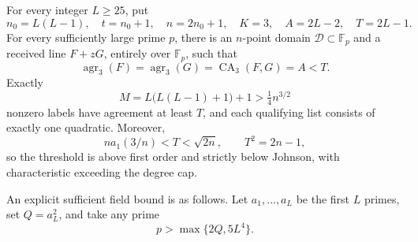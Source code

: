 \begin{theorem}
\label{thm:prime-quadratic-intersection-line}
For every integer $L\ge25$, put
\[
 n_0=L(L-1),\quad t=n_0+1,\quad n=2n_0+1,\quad
 K=3,\quad A=2L-2,\quad T=2L-1.
\]
For every sufficiently large prime $p$, there is an $n$-point domain
$\mathcal D\subset\mathbb F_p$ and a received line $F+zG$, entirely over
$\mathbb F_p$, such that
\[
 \operatorname{agr}_3(F)=\operatorname{agr}_3(G)
   =\operatorname{CA}_3(F,G)=A<T.
\]
Exactly
\[
 M=L\bigl(L(L-1)+1\bigr)+1>\tfrac14 n^{3/2}
\]
nonzero labels have agreement at least $T$, and each qualifying list
consists of exactly one quadratic. Moreover,
\[
 n a_1(3/n)<T<\sqrt{2n},\qquad T^2=2n-1,
\]
so the threshold is above first order and strictly below Johnson, with
characteristic exceeding the degree cap.

An explicit sufficient field bound is as follows. Let $a_1,\ldots,a_L$
be the first $L$ primes, set $Q=a_L^2$, and take any prime
\[
 p>\max\{2Q,5L^4\}.
\]
\end{theorem}
